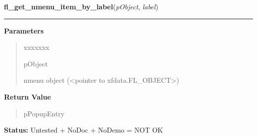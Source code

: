 \hspace{.8\funcindent}\begin{boxedminipage}{\funcwidth}

    \raggedright \textbf{fl\_get\_nmenu\_item\_by\_label}(\textit{pObject}, \textit{label})

    \vspace{-1.5ex}

    \rule{\textwidth}{0.5\fboxrule}
\setlength{\parskip}{2ex}
\setlength{\parskip}{1ex}
      \textbf{Parameters}
      \vspace{-1ex}

      \begin{quote}
        \begin{Ventry}{xxxxxxx}

          \item[pObject]

          nmenu object ({\textless}pointer to 
          xfdata.FL\_OBJECT{\textgreater})

        \end{Ventry}

      \end{quote}

      \textbf{Return Value}
    \vspace{-1ex}

      \begin{quote}
      pPopupEntry

      \end{quote}

\textbf{Status:} Untested + NoDoc + NoDemo = NOT OK



    \end{boxedminipage}

    \label{xformslib:library:fl_get_nmenu_item_by_text}

    \vspace{0.5ex}


